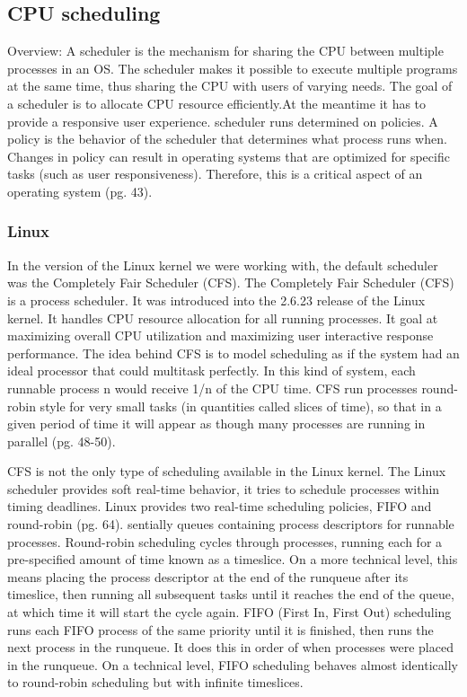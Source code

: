 \documentclass[10pt,draftclsnofoot,onecolumn,journal,compsoc]{IEEEtran}
\newcommand{\tab}{\hspace*{2em}} %
\begin{document}
\subsection{CPU scheduling}
\tab Overview: A scheduler is the mechanism for sharing the CPU between multiple processes in an OS. The scheduler makes it possible to execute multiple programs at the same time, thus sharing the CPU with users of varying needs. The goal of a scheduler is to allocate CPU resource efficiently.At the meantime it has to provide a responsive user experience. scheduler runs determined on policies. A policy is the behavior of the scheduler that determines what process runs when. Changes in policy can result in operating systems that are optimized for specific tasks (such as user responsiveness). Therefore, this is a critical aspect of an operating system \cite{Love}(pg. 43).

\subsubsection*{Linux}
\tab In the version of the Linux kernel we were working with, the default scheduler was the Completely Fair Scheduler (CFS). The Completely Fair Scheduler (CFS) is a process scheduler. It was introduced into the 2.6.23 release of the Linux kernel. It handles CPU resource allocation for all running processes. It goal at maximizing overall CPU utilization and maximizing user interactive response performance. The idea behind CFS is to model scheduling as if the system had an ideal processor that could multitask perfectly. In this kind of system, each runnable process n would receive 1/n of the CPU time. CFS run processes round-robin style for very small tasks (in quantities called slices of time), so that in a given period of time it will appear as though many processes are running in parallel \cite{Love}(pg. 48-50).

\tab CFS is not the only type of scheduling available in the Linux kernel. The Linux scheduler provides soft real-time behavior, it tries to schedule processes within timing deadlines. Linux provides two real-time scheduling policies, FIFO and round-robin \cite{Love}(pg. 64). sentially queues containing process descriptors for runnable processes. Round-robin scheduling cycles through processes, running each for a pre-specified amount of time known as a timeslice. On a more technical level, this means placing the process descriptor at the end of the runqueue after its timeslice, then running all subsequent tasks until it reaches the end of the queue, at which time it will start the cycle again. FIFO (First In, First Out) scheduling runs each FIFO process of the same priority until it is finished, then runs the next process in the runqueue. It does this in order of when processes were placed in the runqueue. On a technical level, FIFO scheduling behaves almost identically to round-robin scheduling but with infinite timeslices.
\end{document}
